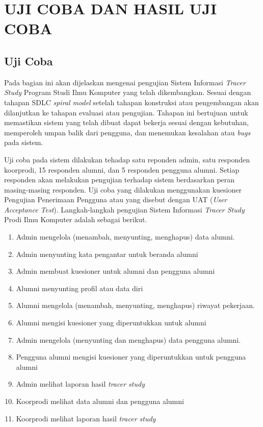 
\chapter{UJI COBA DAN HASIL UJI COBA}

\section{Uji Coba}
Pada bagian ini akan dijelaskan mengenai pengujian Sistem Informasi \textit{Tracer Study} Program Studi Ilmu Komputer yang telah dikembangkan. Sesuai dengan tahapan SDLC \textit{spiral model} setelah tahapan konstruksi atau pengembangan akan dilanjutkan ke tahapan evaluasi atau pengujian. Tahapan ini bertujuan untuk memastikan sistem yang telah dibuat dapat bekerja sesuai dengan kebutuhan, memperoleh umpan balik dari pengguna, dan menemukan kesalahan atau \textit{bugs} pada sistem. 

Uji coba pada sistem dilakukan tehadap satu reponden admin, satu responden koorprodi, 15 responden alumni, dan 5 responden pengguna alumni. Setiap responden akan melakukan pengujian terhadap sistem berdasarkan peran masing-masing responden. Uji coba yang dilakukan menggunakan kuesioner Pengujian Penerimaan Pengguna atau yang disebut dengan UAT (\textit{User Acceptance Test}). Langkah-langkah pengujian Sistem Informasi \textit{Tracer Study} Prodi Ilmu Komputer adalah sebagai berikut. 

\begin{enumerate}
	\item Admin mengelola (menambah, menyunting, menghapus) data alumni. 
	\item Admin menyunting kata pengantar untuk beranda alumni
	\item Admin membuat kuesioner untuk alumni dan pengguna alumni
	\item Alumni menyunting profil atau data diri
	\item Alumni mengelola  (menambah, menyunting, menghapus) riwayat pekerjaan. 
	\item Alumni mengisi kuesioner yang diperuntukkan untuk alumni
	\item Admin mengelola (menyunting dan menghapus) data pengguna alumni.
	\item Pengguna alumni mengisi kuesioner yang diperuntukkan untuk pengguna alumni
	\item Admin melihat laporan hasil \textit{tracer study}
	\item Koorprodi melihat data alumni dan pengguna alumni
	\item Koorprodi melihat laporan hasil \textit{tracer study}
\end{enumerate}

